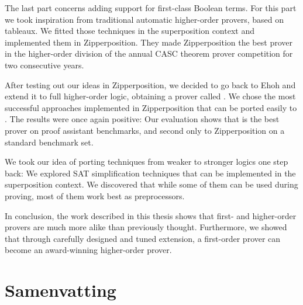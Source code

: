 The last part concerns adding support for
first-class Boolean terms. For this part we took inspiration from traditional
automatic higher-order provers, based on tableaux. We fitted those techniques in the
superposition context and implemented them in Zipperposition. They
made Zipperposition the best prover in the higher-order division of the annual CASC
theorem prover competition for two consecutive years.

After testing out our ideas in Zipperposition, we decided to go back to Ehoh and
extend it to full higher-order logic, obtaining a prover called \ehohii{}. We
chose the most successful approaches implemented in Zipperposition that can
be ported easily to \ehohii{}. The results were once again positive: Our
evaluation shows that \ehohii{} is the best prover on proof assistant
benchmarks, and second only to Zipperposition on a standard benchmark set.

We took our idea of porting techniques from weaker to stronger logics one step
back: We explored SAT simplification techniques that can be implemented in the
superposition context. We discovered that while some of them can be used during proving,
most of them work best as preprocessors.

In conclusion, the work described in this thesis shows that first- and
higher-order provers are much more alike than previously thought. Furthermore,
we showed that through carefully designed and tuned extension, a first-order
prover can become an award-winning higher-order prover.

\chapter*{Samenvatting}

{


}




